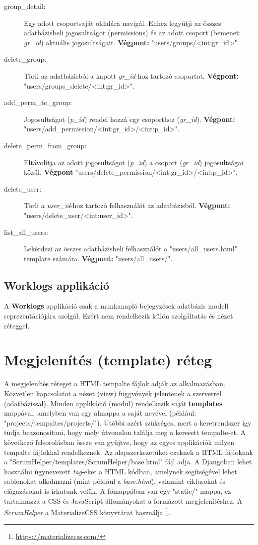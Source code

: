\begin{itemize}
\begin{description}
		\item[group\_detail:] Egy adott csoportsaját oldalára navigál. Ehhez legyűtji az összes adatbázisbeli jogosultságot (permissions) és az adott csoport (bemenet: \textit{gr\_id}) aktuális jogosultságait. \textbf{Végpont:} "users/groups/<int:gr\_id>".
		\item[delete\_group:] Törli az adatbázisból a kapott \textit{gr\_id}-hoz tartozó csoportot. \textbf{Végpont:} "users/groups\_delete/<int:gr\_id>".
		\item[add\_perm\_to\_group:] Jogosultságot (\textit{p\_id}) rendel hozzá egy csoporthoz (\textit{gr\_id}). \textbf{Végpont:} "users/add\_permission/<int:gr\_id>/<int:p\_id>".
		\item[delete\_perm\_from\_group:] Eltávolítja az adott jogosultságot (\textit{p\_id}) a csoport (\textit{gr\_id}) jogosultságai közül. \textbf{Végpont} "users/delete\_permission/<int:gr\_id>/<int:p\_id>".
		\item[delete\_user:] Törli a \textit{user\_id}-hoz tartozó felhasználót az adatbázisból. \textbf{Végpont:} "users/delete\_user/<int:user\_id>".
		\item[list\_all\_users:] Lekérdezi az összes adatbázisbeli felhasználót a "users/all\_users.html" template számára. \textbf{Végpont:} "users/all\_users/".
	\end{description}
\end{itemize}	

\subsection{Worklogs applikáció}

A \textbf{Worklogs} applikáció csak a munkanapló bejegyzések adatbázis modell reprezentációjára szolgál. Ezért nem rendelkezik külön szolgáltatás és nézet réteggel.

\section{Megjelenítés (template) réteg}

A megjelenítés réteget a HTML tempalte fájlok adják az alkalmazásban. Közvetlen kapcsolatot a nézet (view) függvények jelentenek a szerverrel (adatbázissal). Minden applikáció (modul) rendelkezik saját \textbf{templates} mappával, amelyben van egy almappa a saját nevével (például: "projects/tempaltes/projects/"). Utóbbi azért szükséges, mert a keretrendszer így tudja beazonosítani, hogy mely útvonalon találja meg a keresett tempalte-et. A következő felsorolásban össze van gyűjtve, hogy az egyes applikációk milyen tempalte fájlokkal rendelkeznek. Az alapszerkezetüket ezeknek a HTML fájloknak a "ScrumHelper/templates/ScrumHelper/base.html" fájl adja. A Djangoban lehet használni úgynevezett \textit{tag}-eket a HTML kódban, amelynek segítségével lehet sablonokat alkalmazni (mint például a \textit{base.html}), valamint ciklusokat és elágazásokat is írhatunk velük. A főmappában van egy "static/" mappa, ez tartalmazza a CSS és JavaScript állományokat a formázott megjelenítéshez. A \textit{ScrumHelper} a MaterializeCSS könyvtárat használja \footnote{\url{https://materializecss.com/}}.

